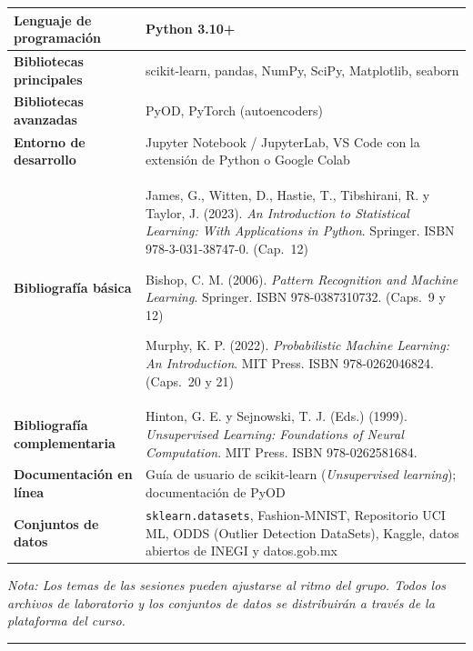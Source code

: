 \documentclass[11pt,letterpaper]{article}
\begin{document}
\begin{center}
\renewcommand{\arraystretch}{1.2}
\begin{tabularx}{\textwidth}{|>{\raggedright\arraybackslash\leavevmode\color{marino}\bfseries}p{4.2cm}|X|}
\hline
Lenguaje de programación & Python 3.10+ \\ \hline
Bibliotecas principales  & scikit-learn, pandas, NumPy, SciPy, Matplotlib, seaborn \\ \hline
Bibliotecas avanzadas    & PyOD, PyTorch (autoencoders) \\ \hline
Entorno de desarrollo    & Jupyter Notebook / JupyterLab, VS Code con la extensión de Python o Google Colab \\ \hline
Bibliografía básica      &
James, G., Witten, D., Hastie, T., Tibshirani, R. y Taylor, J. (2023).
\emph{An Introduction to Statistical Learning: With Applications in Python}.
Springer. ISBN 978-3-031-38747-0. (Cap.~12)\par\vspace{3pt}
Bishop, C. M. (2006). \emph{Pattern Recognition and Machine Learning}.
Springer. ISBN 978-0387310732. (Caps.~9 y 12)\par\vspace{3pt}
Murphy, K. P. (2022). \emph{Probabilistic Machine Learning: An Introduction}.
MIT Press. ISBN 978-0262046824. (Caps.~20 y 21) \\ \hline
Bibliografía complementaria &
Hinton, G. E. y Sejnowski, T. J. (Eds.) (1999). \emph{Unsupervised Learning:
Foundations of Neural Computation}. MIT Press. ISBN 978-0262581684. \\ \hline
Documentación en línea   &
Guía de usuario de scikit-learn (\emph{Unsupervised learning}); documentación de PyOD \\ \hline
Conjuntos de datos       &
\texttt{sklearn.datasets}, Fashion-MNIST, Repositorio UCI ML, ODDS (Outlier
Detection DataSets), Kaggle, datos abiertos de INEGI y datos.gob.mx \\ \hline
\end{tabularx}
\end{center}

{\footnotesize\itshape\color{gray}
Nota: Los temas de las sesiones pueden ajustarse al ritmo del grupo. Todos los
archivos de laboratorio y los conjuntos de datos se distribuirán a través de la
plataforma del curso.}\\[-6pt]
{\color{gray}\rule{\textwidth}{0.4pt}}
\end{document}
